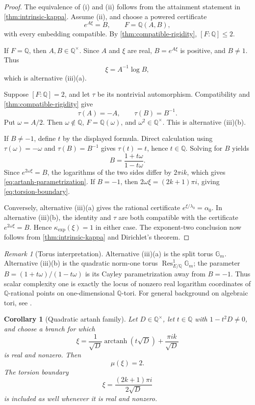 \documentclass[11pt]{article}
\newcommand{\QQ}{\mathbb Q}
\newcommand{\Gm}{\mathbb G_m}
\DeclareMathOperator{\arctanh}{arctanh}
\newtheorem{corollary}[theorem]{Corollary}
\theoremstyle{definition}
\theoremstyle{remark}
\newtheorem{remark}[theorem]{Remark}
\numberwithin{equation}{section}
\begin{document}
\begin{proof}
The equivalence of \textup{(i)} and \textup{(ii)} follows from the
attainment statement in \cref{thm:intrinsic-kappa}.  Assume
\textup{(ii)}, and choose a powered certificate
\[
 e^{A\xi}=B,
 \qquad
 F=\QQ(A,B),
\]
with every embedding compatible.  By
\cref{thm:compatible-rigidity}, $[F:\QQ]\le2$.

If $F=\QQ$, then $A,B\in\QQ^\times$.  Since $A$ and $\xi$ are real,
$B=e^{A\xi}$ is positive, and $B\ne1$.  Thus
\[
 \xi=A^{-1}\log B,
\]
which is alternative \textup{(iii)(a)}.

Suppose $[F:\QQ]=2$, and let $\tau$ be its nontrivial automorphism.
Compatibility and \cref{thm:compatible-rigidity} give
\[
 \tau(A)=-A,
 \qquad
 \tau(B)=B^{-1}.
\]
Put $\omega=A/2$.  Then $\omega\notin\QQ$,
$F=\QQ(\omega)$, and $\omega^2\in\QQ^\times$.  This is alternative
\textup{(iii)(b)}.

If $B\ne-1$, define $t$ by the displayed formula.  Direct calculation
using $\tau(\omega)=-\omega$ and $\tau(B)=B^{-1}$ gives
$\tau(t)=t$, hence $t\in\QQ$.  Solving for $B$ yields
\[
 B=\frac{1+t\omega}{1-t\omega}.
\]
Since $e^{2\omega\xi}=B$, the logarithms of the two sides differ by
$2\pi i k$, which gives \eqref{eq:artanh-parametrization}.  If $B=-1$,
then $2\omega\xi=(2k+1)\pi i$, giving
\eqref{eq:torsion-boundary}.

Conversely, alternative \textup{(iii)(a)} gives the rational
certificate $e^{\xi/\lambda_0}=\alpha_0$.  In alternative \textup{(iii)(b)}, the
identity and $\tau$ are both compatible with the certificate
$e^{2\omega\xi}=B$.  Hence $\kappa_{\exp}(\xi)=1$ in either case.
The exponent-two conclusion now follows from
\cref{thm:intrinsic-kappa} and Dirichlet's theorem.
\end{proof}

\begin{remark}[Torus interpretation]
Alternative \textup{(iii)(a)} is the split torus $\Gm$.  Alternative
\textup{(iii)(b)} is the quadratic norm-one torus
$\operatorname{Res}^{1}_{E/\QQ}\Gm$; the parameter
$B=(1+t\omega)/(1-t\omega)$ is its Cayley parametrization away from
$B=-1$.  Thus scalar complexity one is exactly the locus of nonzero real
logarithm coordinates of $\QQ$-rational points on one-dimensional
$\QQ$-tori.  For general background on algebraic tori, see
\cite[Chapter~12]{Milne2017}.
\end{remark}

\begin{corollary}[Quadratic artanh family]
\label{cor:quadratic-artanh}
Let $D\in\QQ^\times$, let $t\in\QQ$ with $1-t^2D\ne0$, and choose a branch for which
\[
 \xi=\frac1{\sqrt D}\arctanh(t\sqrt D)
      +\frac{\pi i k}{\sqrt D}
\]
is real and nonzero.  Then
\[
 \boxed{\mu(\xi)=2.}
\]
The torsion boundary
\[
 \xi=\frac{(2k+1)\pi i}{2\sqrt D}
\]
is included as well whenever it is real and nonzero.
\end{corollary}
\end{document}
